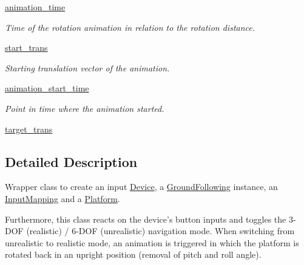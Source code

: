 \begin{DoxyCompactItemize}
\hyperlink{classlib_1_1Navigation_1_1Navigation_adcd00436504ee619f25a8c738cc22baa}{animation\-\_\-time}
\begin{DoxyCompactList}\small\item\em \-Time of the rotation animation in relation to the rotation distance. \end{DoxyCompactList}\item 
\hyperlink{classlib_1_1Navigation_1_1Navigation_a0402444ad79196cdafa412e0bcc5b22d}{start\-\_\-trans}
\begin{DoxyCompactList}\small\item\em \-Starting translation vector of the animation. \end{DoxyCompactList}\item 
\hyperlink{classlib_1_1Navigation_1_1Navigation_a531229392acfce64e0bfb196d586c496}{animation\-\_\-start\-\_\-time}
\begin{DoxyCompactList}\small\item\em \-Point in time where the animation started. \end{DoxyCompactList}\item 
\hyperlink{classlib_1_1Navigation_1_1Navigation_abddb6bde6f446f0a1a3711620d926dd9}{target\-\_\-trans}
\end{DoxyCompactItemize}


\subsection{\-Detailed \-Description}
\-Wrapper class to create an input \hyperlink{namespacelib_1_1Device}{\-Device}, a \hyperlink{namespacelib_1_1GroundFollowing}{\-Ground\-Following} instance, an \hyperlink{namespacelib_1_1InputMapping}{\-Input\-Mapping} and a \hyperlink{namespacelib_1_1Platform}{\-Platform}. 

\-Furthermore, this class reacts on the device's button inputs and toggles the 3-\/\-D\-O\-F (realistic) / 6-\/\-D\-O\-F (unrealistic) navigation mode. \-When switching from unrealistic to realistic mode, an animation is triggered in which the platform is rotated back in an upright position (removal of pitch and roll angle). 

